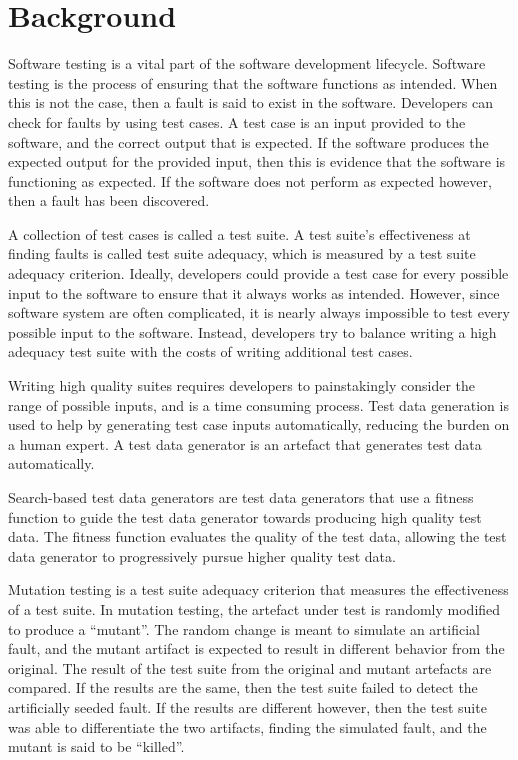 \section{Background}
Software testing is a vital part of the software development lifecycle.  Software testing is the
process of ensuring that the software functions as intended.  When this is not the case, then a fault
is said to exist in the software. Developers can check for faults by using test cases. A test case is
an input provided to the software, and the correct output that is expected. If the software produces
the expected output for the provided input, then this is evidence that the software is functioning as
expected.  If the software does not perform as expected however, then a fault has been discovered.

A collection of test cases is called a test suite. A test suite's effectiveness at finding faults is
called test suite adequacy, which is measured by a test suite adequacy criterion.
Ideally, developers could provide a test case for every possible input to the software to ensure
that it always works as intended. However, since
software system are often complicated, it is nearly always impossible to test every possible
input to the software. Instead, developers try to balance writing a high adequacy test suite
with the costs of writing additional test cases.

Writing high quality suites requires developers to painstakingly consider the
range of possible inputs, and is a time consuming process. Test data generation is used to
help by generating test case inputs automatically, reducing the burden on a human expert. A test data
generator is an artefact that generates test data automatically.

Search-based test data generators are test data generators that use a fitness function to guide the
test data generator towards producing high quality test data. The fitness function evaluates the
quality of the test data, allowing the test data generator to progressively pursue higher quality test 
data.

Mutation testing is a test suite adequacy criterion that measures the effectiveness of a test suite. In
mutation testing, the artefact under test is randomly modified to produce a ``mutant''. The random
change is meant to simulate an artificial fault, and the mutant artifact is expected to result in
different behavior from the original. The result of the test suite from the original and mutant
artefacts are compared. If the results are the same, then the test suite failed to detect the
artificially seeded fault. If the results are different however, then the test suite was able to
differentiate the two artifacts, finding the simulated fault, and the mutant is said to be ``killed''.
